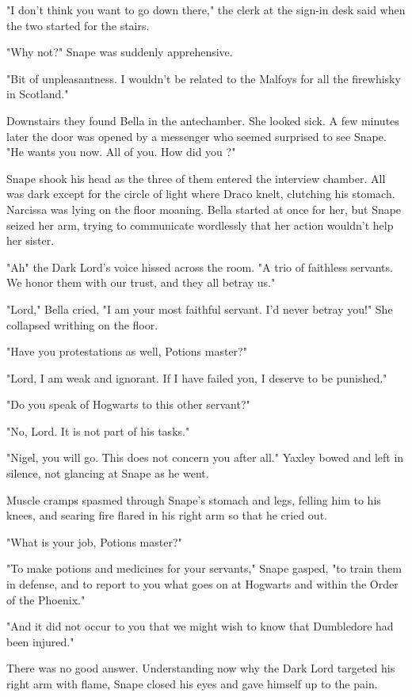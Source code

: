 "I don't think you want to go down there," the clerk at the sign-in desk said when the two started for the stairs.

"Why not?" Snape was suddenly apprehensive.

"Bit of unpleasantness. I wouldn't be related to the Malfoys for all the firewhisky in Scotland."

Downstairs they found Bella in the antechamber. She looked sick. A few minutes later the door was opened by a messenger who seemed surprised to see Snape. "He wants you now. All of you. How did you{\el} ?"

Snape shook his head as the three of them entered the interview chamber. All was dark except for the circle of light where Draco knelt, clutching his stomach. Narcissa was lying on the floor moaning. Bella started at once for her, but Snape seized her arm, trying to communicate wordlessly that her action wouldn't help her sister.

"Ah{\el}" the Dark Lord's voice hissed across the room. "A trio of faithless servants. We honor them with our trust, and they all betray us."

"Lord," Bella cried, "I am your most faithful servant. I'd never betray you!" She collapsed writhing on the floor.

"Have you protestations as well, Potions master?"

"Lord, I am weak and ignorant. If I have failed you, I deserve to be punished."

"Do you speak of Hogwarts to this other servant?"

"No, Lord. It is not part of his tasks."

"Nigel, you will go. This does not concern you after all." Yaxley bowed and left in silence, not glancing at Snape as he went.

Muscle cramps spasmed through Snape's stomach and legs, felling him to his knees, and searing fire flared in his right arm so that he cried out.

"What is your job, Potions master?"

"To make potions and medicines for your servants," Snape gasped, "to train them in defense, and to report to you what goes on at Hogwarts and within the Order of the Phoenix."

"And it did not occur to you that we might wish to know that Dumbledore had been injured."

There was no good answer. Understanding now why the Dark Lord targeted his right arm with flame, Snape closed his eyes and gave himself up to the pain.

